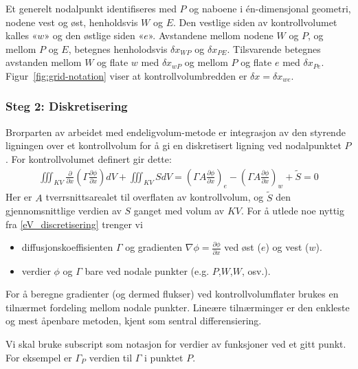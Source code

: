 Et generelt nodalpunkt identifiseres med $P$ og naboene i én-dimensjonal geometri, nodene vest og øst, henholdsvis $W$ og $E$. Den vestlige siden av kontrollvolumet kalles «$w$» og den østlige siden «$e$». Avstandene mellom nodene $W$ og $P$, og mellom $P$ og $E$, betegnes henholodsvis $\delta x_{WP}$ og $\delta x_{PE}$. Tilsvarende betegnes avstanden mellom $W$ og flate $w$ med $\delta x_{wP}$ og mellom $P$ og flate $e$ med $\delta x_{Pe}$. Figur~\ref{fig:grid-notation} viser at kontrollvolumbredden er $\delta x = \delta x_{we}$.

\subsubsection*{Steg 2: Diskretisering}
Brorparten av arbeidet med endeligvolum-metode er integrasjon av den styrende ligningen over et kontrollvolum for å gi en diskretisert ligning ved nodalpunktet $P$. For kontrollvolumet definert gir dette:
\begin{align}\label{eV_discretisering}
\iiint_{KV} \frac{\partial}{\partial x} \left(\Gamma \frac{\partial\phi}{\partial x} \right) dV + \iiint_{KV} S dV = \left(\Gamma A \frac{\partial\phi}{\partial x}\right)_e- \left( \Gamma A \frac{\partial\phi}{\partial x} \right)_w + \tilde{S} = 0
\end{align}
Her er $A$ tverrsnittsarealet til overflaten av kontrollvolum, og $\tilde{S}$ den gjennomsnittlige verdien av $S$ ganget med volum av $KV$. 
For å utlede noe nyttig fra \eqref{eV_discretisering} trenger vi
\begin{itemize}
\item diffusjonskoeffisienten $\Gamma$ og gradienten $\nabla \phi = \frac{\partial \phi}{\partial x}$ ved øst ($e$) og vest ($w$).
\item verdier $\phi$ og $\Gamma$ bare ved nodale punkter (e.g. $P$,$W$,$W$, osv.).
\end{itemize}
For å beregne gradienter (og dermed flukser) ved kontrollvolumflater brukes en tilnærmet fordeling mellom nodale punkter. Lineære tilnærminger er den enkleste og mest åpenbare metoden, kjent som sentral differensiering.

\begin{defn}{}
Vi skal bruke subscript som notasjon for  verdier av funksjoner ved et gitt punkt. For eksempel er $\Gamma_P$ verdien til $\Gamma$ i punktet $P$.
\end{defn}

